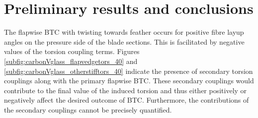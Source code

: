 \documentclass[a4paper]{jpconf}
\begin{document}
\section{Preliminary results and conclusions}
\label{sec:results}
The flapwise BTC with twisting towards feather occurs for positive fibre layup angles on the pressure side of the blade sections. This is facilitated by negative values of the torsion coupling terms. Figures \ref{subfig:carbonVglass_flapvedgetors_40} and \ref{subfig:carbonVglass_otherstifftors_40} indicate the presence of secondary torsion couplings along with the primary flapwise BTC. These secondary couplings would contribute to the final value of the induced torsion and thus either positively or negatively affect the desired outcome of BTC. Furthermore, the contributions of the secondary couplings cannot be precisely quantified.      
\end{document}
